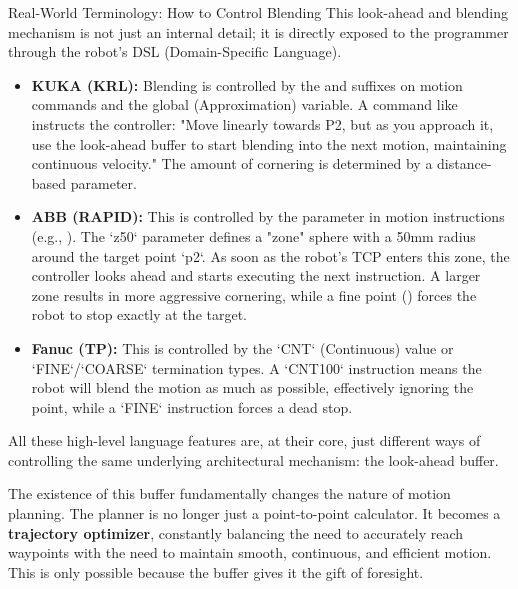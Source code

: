 \begin{tipbox}{Real-World Terminology: How to Control Blending}
This look-ahead and blending mechanism is not just an internal detail; it is directly exposed to the programmer through the robot's DSL (Domain-Specific Language).
\begin{itemize}
    \item \textbf{KUKA (KRL):} Blending is controlled by the  and  suffixes on motion commands and the global  (Approximation) variable. A command like  instructs the controller: "Move linearly towards P2, but as you approach it, use the look-ahead buffer to start blending into the next motion, maintaining continuous velocity." The amount of cornering is determined by a distance-based parameter.
    \item \textbf{ABB (RAPID):} This is controlled by the  parameter in motion instructions (e.g., ). The `z50` parameter defines a "zone" sphere with a 50mm radius around the target point `p2`. As soon as the robot's TCP enters this zone, the controller looks ahead and starts executing the next instruction. A larger zone results in more aggressive cornering, while a fine point () forces the robot to stop exactly at the target.
    \item \textbf{Fanuc (TP):} This is controlled by the `CNT` (Continuous) value or `FINE`/`COARSE` termination types. A `CNT100` instruction means the robot will blend the motion as much as possible, effectively ignoring the point, while a `FINE` instruction forces a dead stop.
\end{itemize}
All these high-level language features are, at their core, just different ways of controlling the same underlying architectural mechanism: the look-ahead buffer.
\end{tipbox}

The existence of this buffer fundamentally changes the nature of motion planning. The planner is no longer just a point-to-point calculator. It becomes a \textbf{trajectory optimizer}, constantly balancing the need to accurately reach waypoints with the need to maintain smooth, continuous, and efficient motion. This is only possible because the buffer gives it the gift of foresight.




